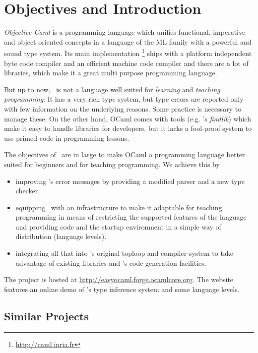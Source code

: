 
\section{Objectives and Introduction}
\label{sec:intro}

\label{hd001}
\textsl{Objective Caml} \citep{leroy2008} is a programming language which unifies 
functional, imperative and object oriented concepts in a language of the ML
family with a powerful and sound type system.  Its main implementation%
\footnote{\url{http://caml.inria.fr}} ships with a platform independent byte code
compiler and an efficient machine code compiler and there are a lot of
libraries, which make it a great multi purpose programming language.

But up to now, \ocaml\ is not a language well suited for \emph{learning} and
\emph{teaching programming}:
It has a very rich type system, but type errors are reported only with few
information on the underlying reasons.
Some practice is necessary to manage these.
On the other hand, OCaml comes with tools (e.g.  \citeauthor{stolpmann}'s
\emph{findlib}) which make it easy to handle libraries for developers, but it
lacks a fool-proof system to use primed code in programming lessons.

The objectives of \easyocaml\ are in large to make OCaml a programming language
better suited for beginners and for teaching programming. We achieve this by

\begin{itemize}
    \item improving \ocaml's error messages by providing a modified 
        parser and a new type checker.
    \item equipping \ocaml\ with an infrastructure to make it 
        adaptable for teaching programming in means of restricting the
        supported features of the language and providing code and the 
        startup environment in a simple way of distribution (language 
        levels).
    \item integrating all that into \ocaml's original toploop and 
        compiler system to take advantage of existing libraries and 
        \ocaml's code generation facilities.
\end{itemize}
The project is hosted at \url{http://easyocaml.forge.ocamlcore.org}.
The website features an online demo of \easyocaml's type inference system and
some language levels.

\subsection*{Similar Projects}

